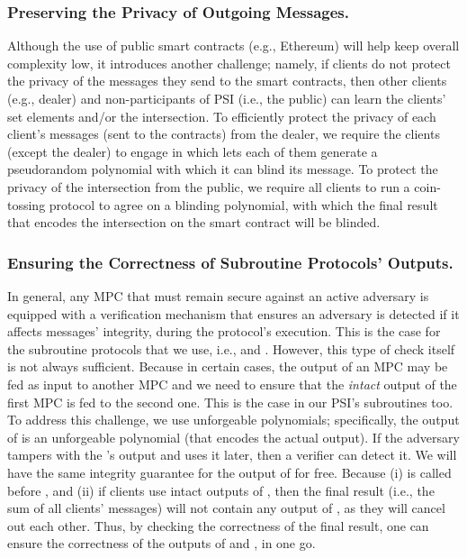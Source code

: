  \subsubsection{Preserving the Privacy of Outgoing Messages.} Although the use of public smart contracts (e.g., Ethereum) will help keep overall complexity low, it introduces another challenge; namely, if clients do not protect the privacy of the messages they send to the smart contracts, then other clients (e.g., dealer) and non-participants of PSI (i.e., the public) can learn the clients' set elements and/or the intersection. To efficiently protect the privacy of each client's messages (sent to the contracts) from the dealer, we require the clients (except the dealer) to engage in \zspaa which lets each of them generate a pseudorandom polynomial with which it can blind its message. To protect the privacy of the intersection from the public, we require all clients to run a coin-tossing protocol to agree on a blinding polynomial, with which the final result that encodes the intersection on the smart contract will be blinded.  
 
 

 \subsubsection{Ensuring the Correctness of Subroutine Protocols' Outputs.} 
 
 In general, any MPC that must remain secure against an active adversary is equipped with a verification mechanism that ensures an adversary is detected if it affects messages' integrity, during the protocol's execution. This is the case for the subroutine protocols that we use, i.e., \vopr and \zspaa. However, this type of check itself is not always sufficient. Because in certain cases, the output of an MPC may be fed as input to another MPC and we need to ensure that the \emph{intact} output of the first MPC is fed to the second one. This is the case in our PSI's subroutines too. To address this challenge, we use unforgeable polynomials; specifically, the output of \vopr is an unforgeable polynomial (that encodes the actual output). If the adversary tampers with the \vopr's output and uses it later, then a verifier can detect it. We will have the same integrity guarantee for the output of \zspaa for free. Because (i) \vopr is called before \zspaa, and (ii) if clients use intact outputs of \zspaa, then the final result (i.e., the sum of all clients' messages) will not contain any output of \zspaa, as they will cancel out each other. Thus, by checking the correctness of the final result, one can ensure the correctness of the outputs of \vopr and \zspaa, in one go. 





 
